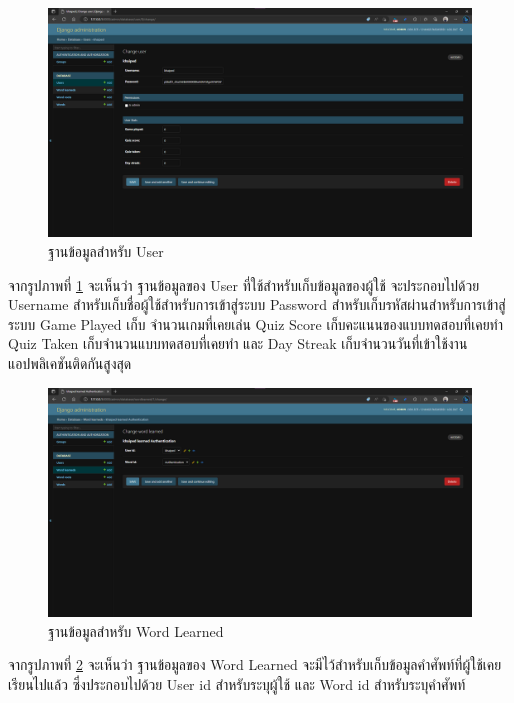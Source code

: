 \documentclass[12pt,oneside,openright,a4paper]{cpe-thai-project}
\begin{document}
\pagebreak
\begin{figure}[!h]\centering
	\includegraphics[width=\textwidth, keepaspectratio=true]{image/chap4/DB/user.png}
	\caption{{ฐานข้อมูลสำหรับ User}}\label{fig:chap4User}
\end{figure}
\hspace{1cm}
จากรูปภาพที่ \ref{fig:chap4User} จะเห็นว่า ฐานข้อมูลของ User ที่ใช้สำหรับเก็บข้อมูลของผู้ใช้
จะประกอบไปด้วย Username สำหรับเก็บชื่อผู้ใช้สำหรับการเข้าสู่ระบบ
Password สำหรับเก็บรหัสผ่านสำหรับการเข้าสู่ระบบ Game Played เก็บ จํานวนเกมที่เคยเล่น
Quiz Score เก็บคะแนนของแบบทดสอบที่เคยทํา Quiz Taken เก็บจํานวนแบบทดสอบที่เคยทํา 
และ Day Streak เก็บจํานวนวันที่เข้าใช้งานแอปพลิเคชันติดกันสูงสุด

\begin{figure}[!h]\centering
	\includegraphics[width=\textwidth, keepaspectratio=true]{image/chap4/DB/word learned.png}
	\caption{{ฐานข้อมูลสำหรับ Word Learned}}\label{fig:chap4WordLearned}
\end{figure}
\hspace{1cm}
จากรูปภาพที่ \ref{fig:chap4WordLearned} จะเห็นว่า ฐานข้อมูลของ Word Learned จะมีไว้สำหรับเก็บข้อมูลคำศัพท์ที่ผู้ใช้เคยเรียนไปแล้ว
ซึ่งประกอบไปด้วย User id สำหรับระบุผู้ใช้ และ Word id สำหรับระบุคำศัพท์
\end{document}
